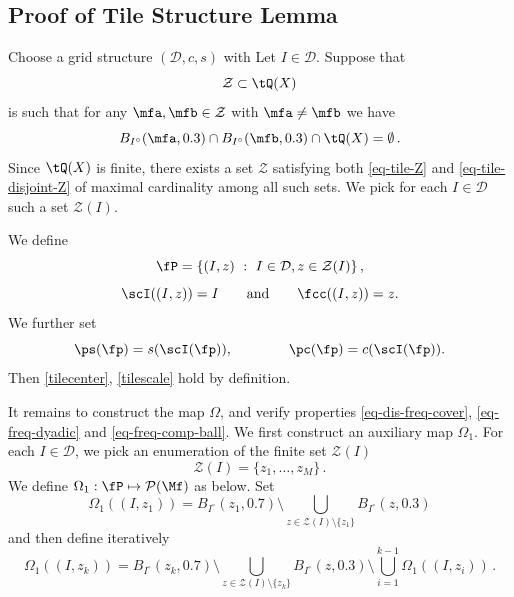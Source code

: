 \subsection{Proof of Tile Structure Lemma}
\label{subsectiles}
Choose a grid structure $(\mathcal{D}, c, s)$ with 
Let $I \in \mathcal{D}$. Suppose that
\begin{equation}
    \label{eq-tile-Z}
    \mathcal{Z} \subset \tQ(X)
\end{equation}
is such that for any $\mfa, \mfb \in \mathcal{Z}$ with $\mfa\ne \mfb$ we have
\begin{equation}
    \label{eq-tile-disjoint-Z}
    B_{I^\circ}(\mfa, 0.3) \cap B_{I^\circ}(\mfb, 0.3) \cap \tQ(X) = \emptyset\,.
\end{equation}
Since $\tQ(X)$ is finite, there exists a set $\mathcal{Z}$ satisfying both \eqref{eq-tile-Z} and \eqref{eq-tile-disjoint-Z} of maximal cardinality among all such sets. We pick for each $I \in \mathcal{D}$ such a set $\mathcal{Z}(I)$.




We define
$$
    \fP = \{(I, z) \ : \ I \in \mathcal{D}, z \in \mathcal{Z}(I)\}\,,
$$
$$\scI((I, z)) = I\qquad \text{and} \qquad \fcc((I, z)) = z.$$ We further set $$\ps(\fp) = s(\scI(\fp)),\qquad \qquad \pc(\fp) = c(\scI(\fp)).$$ Then \eqref{tilecenter}, \eqref{tilescale} hold by definition.

It remains to construct the map $\Omega$, and verify properties \eqref{eq-dis-freq-cover}, \eqref{eq-freq-dyadic} and
\eqref{eq-freq-comp-ball}. We first construct an auxiliary map $\Omega_1$. For each $I \in \mathcal{D}$, we pick an enumeration of the finite set $\mathcal{Z}(I)$
$$
    \mathcal{Z}(I) = \{z_1, \dotsc, z_M\}\,.
$$
We define {$\Omega_1:\fP \mapsto \mathcal{P}(\Mf) $ as below}. Set
$$
    \Omega_1((I, z_1)) = B_{I^\circ}(z_1, 0.7) \setminus \bigcup_{z \in \mathcal{Z}(I)\setminus \{z_1\}} B_{I^\circ}(z, 0.3)
$$
and then define iteratively
\begin{equation}
    \label{eq-def-omega1}
    \Omega_1((I, z_k)) = B_{I^\circ}(z_k, 0.7) \setminus \bigcup_{z \in \mathcal{Z}(I) \setminus \{z_k\}} B_{I^\circ}(z, 0.3) \setminus \bigcup_{i=1}^{k-1} \Omega_1((I, z_i))\,.
\end{equation}






